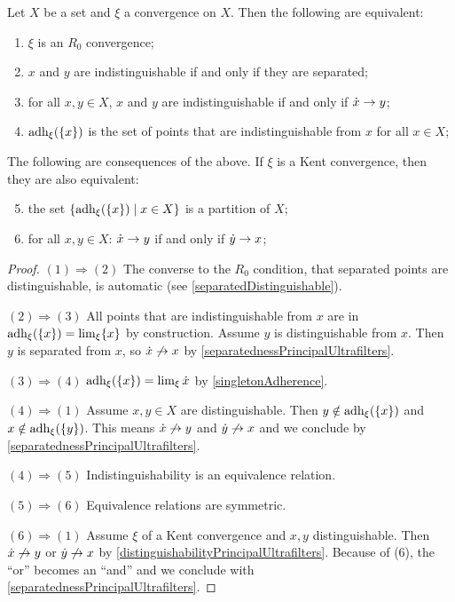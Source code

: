 \begin{proposition} \label{R0conditions}
Let $X$ be a set and $\xi$ a convergence on $X$. Then the following are equivalent:
\begin{enumerate}
\item $\xi$ is an $R_0$ convergence;
\item $x$ and $y$ are indistinguishable \textup{if and only if} they are separated;
\item for all $x,y\in X$, $x$ and $y$ are indistinguishable \textup{if and only if} $\dot{x} \to y$;
\item $\operatorname{adh}_\xi(\{x\})$ is the set of points that are indistinguishable from $x$ for all $x\in X$;
\end{enumerate}
The following are consequences of the above. If $\xi$ is a Kent convergence, then they are also equivalent:
\begin{enumerate} \setcounter{enumi}{4}
\item the set $\left\{ \operatorname{adh}_\xi(\{x\}) \;\middle|\; x\in X \right\}$ is a partition of $X$;
\item for all $x,y\in X$:  $\dot{x} \to y$ \textup{if and only if} $\dot{y} \to x$;
\end{enumerate}
\end{proposition}
\begin{proof}
$(1) \Rightarrow (2)$ The converse to the $R_0$ condition, that separated points are distinguishable, is automatic (see \ref{separatedDistinguishable}).

$(2) \Rightarrow (3)$ All points that are indistinguishable from $x$ are in $\operatorname{adh}_\xi(\{x\}) = \lim_\xi\{x\}$ by construction. Assume $y$ is distinguishable from $x$. Then $y$ is separated from $x$, so $\dot{x}\not\to x$ by \ref{separatednessPrincipalUltrafilters}.

$(3) \Rightarrow (4)$ $\operatorname{adh}_\xi(\{x\}) = \lim_\xi\dot{x}$ by \ref{singletonAdherence}.

$(4) \Rightarrow (1)$ Assume $x,y\in X$ are distinguishable. Then $y\notin\operatorname{adh}_\xi(\{x\})$ and $x\notin\operatorname{adh}_\xi(\{y\})$. This means $\dot{x} \not\to y$ and $\dot{y} \not\to x$ and we conclude by \ref{separatednessPrincipalUltrafilters}.


$(4) \Rightarrow (5)$ Indistinguishability is an equivalence relation.

$(5) \Rightarrow (6)$ Equivalence relations are symmetric.

$(6) \Rightarrow (1)$ Assume $\xi$ of a Kent convergence and $x,y$ distinguishable. Then $\dot{x}\not\to y$ or $\dot{y}\not\to x$ by \ref{distinguishabilityPrincipalUltrafilters}. Because of (6), the ``or'' becomes an ``and'' and we conclude with \ref{separatednessPrincipalUltrafilters}.
\end{proof}


